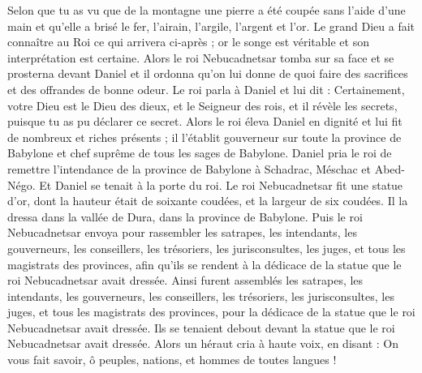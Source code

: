 \begin{multicols}{2}
Selon que tu as vu que de la montagne une pierre a été coupée sans l'aide d'une main et qu'elle a brisé le fer, l'airain, l'argile, l'argent et l'or. Le grand Dieu a fait connaître au Roi ce qui arrivera ci-après ; or le songe est véritable et son interprétation est certaine.
Alors le roi Nebucadnetsar tomba sur sa face et se prosterna devant Daniel et il ordonna qu'on lui donne de quoi faire des sacrifices et des offrandes de bonne odeur.
Le roi parla à Daniel et lui dit : Certainement, votre Dieu est le Dieu des dieux, et le Seigneur des rois, et il révèle les secrets, puisque tu as pu déclarer ce secret.
Alors le roi éleva Daniel en dignité et lui fit de nombreux et riches présents ; il l'établit gouverneur sur toute la province de Babylone et chef suprême de tous les sages de Babylone.
Daniel pria le roi de remettre l'intendance de la province de Babylone à Schadrac, Méschac et Abed-Négo. Et Daniel se tenait à la porte du roi.
\VerseOne{}Le roi Nebucadnetsar fit une statue d'or, dont la hauteur était de soixante coudées, et la largeur de six coudées. Il la dressa dans la vallée de Dura, dans la province de Babylone.
Puis le roi Nebucadnetsar envoya pour rassembler les satrapes, les intendants, les gouverneurs, les conseillers, les trésoriers, les jurisconsultes, les juges, et tous les magistrats des provinces, afin qu'ils se rendent à la dédicace de la statue que le roi Nebucadnetsar avait dressée.
Ainsi furent assemblés les satrapes, les intendants, les gouverneurs, les conseillers, les trésoriers, les jurisconsultes, les juges, et tous les magistrats des provinces, pour la dédicace de la statue que le roi Nebucadnetsar avait dressée. Ils se tenaient debout devant la statue que le roi Nebucadnetsar avait dressée.
Alors un héraut cria à haute voix, en disant : On vous fait savoir, ô peuples, nations, et hommes de toutes langues !

\end{multicols}
